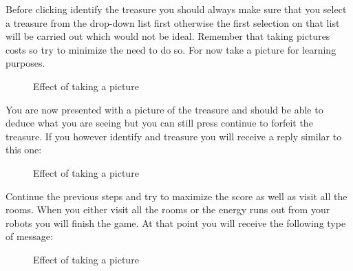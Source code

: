 	Before clicking identify the treasure you should always make sure that you select a treasure from the drop-down list first otherwise the first selection on that list will be carried out which would not be ideal. Remember that taking pictures costs so try to minimize the need to do so. For now take a picture for learning purposes.

	\begin{figure}[htp]
		\centering
		\caption{Effect of taking a picture}
	\end{figure}

	You are now presented with a picture of the treasure and should be able to deduce what you are seeing but you can still press continue to forfeit the treasure. If you however identify and treasure you will receive a reply similar to this one:

	\begin{figure}[htp]
		\centering
		\caption{Effect of taking a picture}
	\end{figure}

	Continue the previous steps and try to maximize the score as well as visit all the rooms. When you either visit all the rooms or the energy runs out from your robots you will finish the game. At that point you will receive the following type of message:
	\begin{figure}[htp]
		\centering
		\caption{Effect of taking a picture}
	\end{figure}